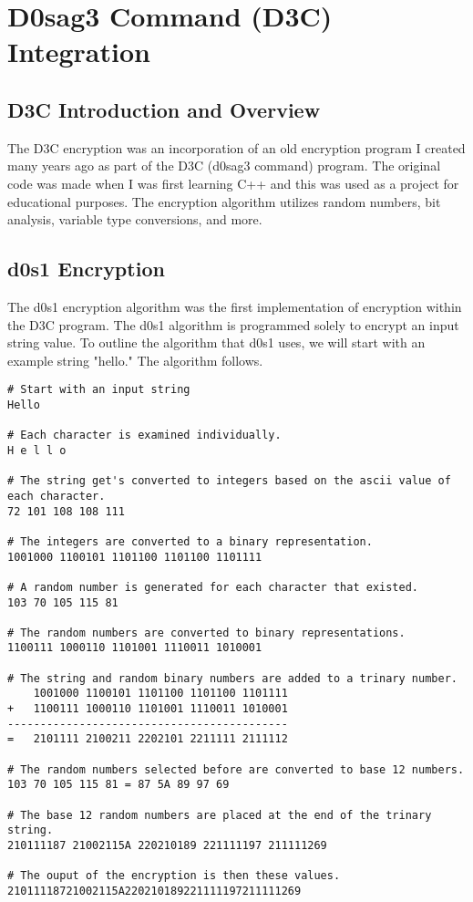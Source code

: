 \chapter{D0sag3 Command (D3C) Integration} \label{D3C}
\pagestyle{fancy}

\section{D3C Introduction and Overview}

The D3C encryption was an incorporation of an old encryption program I created many years ago as part of the D3C (d0sag3 command) program. The original code was made when I was first learning C++ and this was used as a project for educational purposes. The encryption algorithm utilizes random numbers, bit analysis, variable type conversions, and more. 

\section{d0s1 Encryption}

The d0s1 encryption algorithm was the first implementation of encryption within the D3C program. The d0s1 algorithm is programmed solely to encrypt an input string value. To outline the algorithm that d0s1 uses, we will start with an example string "hello." The algorithm follows.

\begin{lstlisting}
# Start with an input string
Hello

# Each character is examined individually.
H e l l o

# The string get's converted to integers based on the ascii value of each character.
72 101 108 108 111

# The integers are converted to a binary representation.
1001000 1100101 1101100 1101100 1101111

# A random number is generated for each character that existed.
103 70 105 115 81

# The random numbers are converted to binary representations.
1100111 1000110 1101001 1110011 1010001

# The string and random binary numbers are added to a trinary number.
	1001000 1100101 1101100 1101100 1101111
+	1100111 1000110 1101001 1110011 1010001
-------------------------------------------
=	2101111 2100211 2202101 2211111 2111112

# The random numbers selected before are converted to base 12 numbers.
103 70 105 115 81 = 87 5A 89 97 69

# The base 12 random numbers are placed at the end of the trinary string.
210111187 21002115A 220210189 221111197 211111269

# The ouput of the encryption is then these values.
21011118721002115A220210189221111197211111269
\end{lstlisting}

